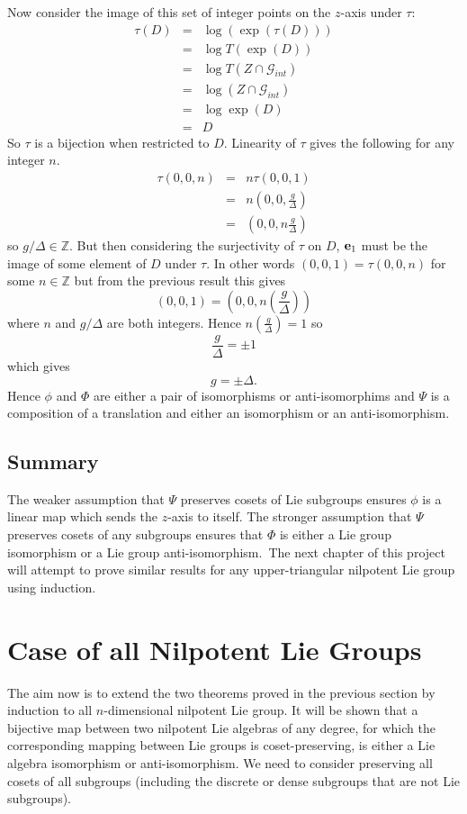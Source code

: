 \documentclass[honours]{UNSWthesis}
\newcommand{\Z}{\mathbb{Z}}
\newcommand{\G}{\mathcal{G}}
\newcommand{\1}{\mathbf{e}_{1}}
\newcommand{\2}{\mathbf{e}_{3}}
\newcommand{\3}{\mathbf{e}_{3}}
\begin{document}
Now consider the image of this set of integer points on the $z$-axis under $\tau$:
\begin{eqnarray*}
\tau(D)&=& \log(\exp (\tau(D))) \\
&=& \log T(\exp (D)) \\
&=& \log T(Z \cap \G_{int}) \\
&=& \log (Z \cap \G_{int}) \\
&=& \log \exp (D) \\
&=& D
\end{eqnarray*}
So $\tau$ is a bijection when restricted to $D$. Linearity of $\tau$ gives the following for any integer $n$.
\begin{eqnarray*}
\tau (0,0,n) &=& n \tau (0,0,1) \\
&=& n\left(0,0, \frac{g}{\Delta}\right) \\
&=& \left(0,0, n \frac{g}{\Delta}\right)
\end{eqnarray*}
so $g/\Delta \in \Z$. But then considering the surjectivity of $\tau$ on $D$, ${\bf e}_{1}$ must be the image of some element of $D$ under $\tau$. In other words $(0,0,1)=\tau(0,0,n)$ for some $n \in \Z$ but from the previous result this gives 
\[
(0,0,1)=\left(0,0, n\left(\frac{g}{\Delta}\right)\right)
\]
where $n$ and $g/\Delta$ are both integers. Hence $n \left( \frac{g}{\Delta}\right)=1$ so 
\[
\frac{g}{\Delta}= \pm 1
\]
which gives
\[
g=\pm \Delta.
\]
Hence $\phi$ and $\Phi$ are either a pair of isomorphisms or anti-isomorphims and $\Psi$ is a composition of a translation and either an isomorphism or an anti-isomorphism.

\section{Summary}
The weaker assumption that $\Psi$ preserves cosets of Lie subgroups ensures $\phi$ is a linear map which sends the $z$-axis to itself. The stronger assumption that $\Psi$ preserves cosets of any subgroups ensures that $\Phi$ is either a Lie group isomorphism or a Lie group anti-isomorphism.\
The next chapter of this project will attempt to prove similar results for any upper-triangular nilpotent Lie group using induction. 






\chapter{Case of all Nilpotent Lie Groups}
The aim now is to extend the two theorems proved in the previous section by induction to all $n$-dimensional nilpotent Lie group. It will be shown that a bijective map between two nilpotent Lie algebras of any degree, for which the corresponding mapping between Lie groups is coset-preserving, is either a Lie algebra isomorphism or anti-isomorphism. We need to consider preserving all cosets of all subgroups (including the discrete or dense subgroups that are not Lie subgroups). 
\end{document}
